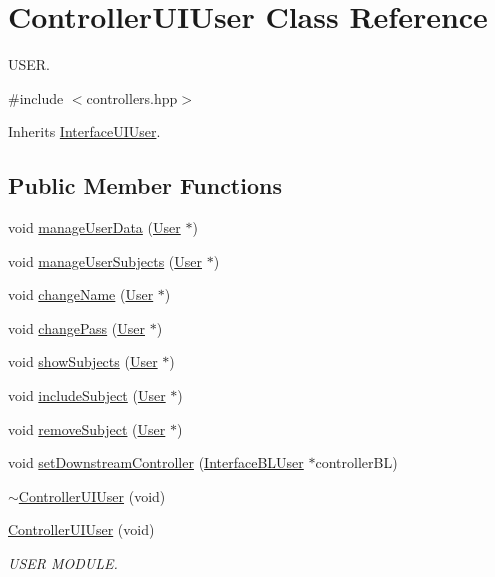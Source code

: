 \hypertarget{class_controller_u_i_user}{}\section{Controller\+U\+I\+User Class Reference}
\label{class_controller_u_i_user}


U\+S\+ER.  




{\ttfamily \#include $<$controllers.\+hpp$>$}



Inherits \hyperlink{class_interface_u_i_user}{Interface\+U\+I\+User}.

\subsection*{Public Member Functions}
\begin{DoxyCompactItemize}
\item 
void \hyperlink{class_controller_u_i_user_a3d496ebc4d35be9d001c543ccc605341}{manage\+User\+Data} (\hyperlink{class_user}{User} $\ast$)
\item 
void \hyperlink{class_controller_u_i_user_a6a3a889cc4726487baa3e2f19f646810}{manage\+User\+Subjects} (\hyperlink{class_user}{User} $\ast$)
\item 
void \hyperlink{class_controller_u_i_user_a294982fc334de0b9a520823ff05b545e}{change\+Name} (\hyperlink{class_user}{User} $\ast$)
\item 
void \hyperlink{class_controller_u_i_user_a769122f009fe45b3c9f4f63afe5c043e}{change\+Pass} (\hyperlink{class_user}{User} $\ast$)
\item 
void \hyperlink{class_controller_u_i_user_a98a0e51ff5b82264bdda2683e5b19e36}{show\+Subjects} (\hyperlink{class_user}{User} $\ast$)
\item 
void \hyperlink{class_controller_u_i_user_a9bf2ce224d3d3064542c89a287cb93ca}{include\+Subject} (\hyperlink{class_user}{User} $\ast$)
\item 
void \hyperlink{class_controller_u_i_user_a6ec069819ab7fe85b8419ee00714b8a3}{remove\+Subject} (\hyperlink{class_user}{User} $\ast$)
\item 
void \hyperlink{class_controller_u_i_user_ad4ad2668cd963c5fa733bb8988268d99}{set\+Downstream\+Controller} (\hyperlink{class_interface_b_l_user}{Interface\+B\+L\+User} $\ast$controller\+BL)
\item 
\hyperlink{class_controller_u_i_user_a1bc1cdf0a434adb9211341ddaea89cbd}{$\sim$\+Controller\+U\+I\+User} (void)
\item 
\hyperlink{class_controller_u_i_user_a84d2a2ab0a27ce9c81dad0b1ba020492}{Controller\+U\+I\+User} (void)
\begin{DoxyCompactList}\small\item\em U\+S\+ER M\+O\+D\+U\+LE. \end{DoxyCompactList}\end{DoxyCompactItemize}


